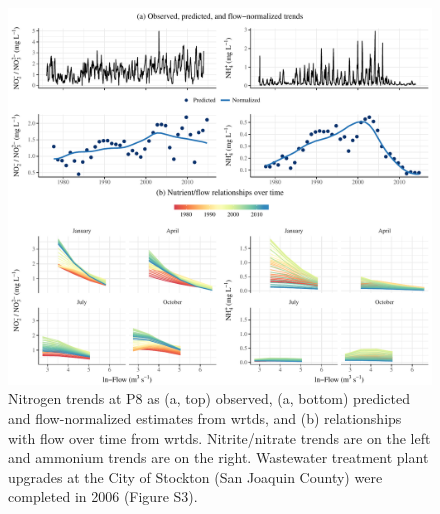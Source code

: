 \documentclass[journal = esthag, manuscript = article]{achemso}\usepackage[]{graphicx}\usepackage[]{color}
\begin{document}
\begin{figure}[!ht]

{\centering \includegraphics[width=\textwidth]{figs/p8trnds-1} 

}

\caption[Nitrogen trends at P8 as (a, top) observed, (a, bottom) predicted and flow-normalized estimates from \ac{wrtds}, and (b) relationships with flow over time from \ac{wrtds}]{Nitrogen trends at P8 as (a, top) observed, (a, bottom) predicted and flow-normalized estimates from \ac{wrtds}, and (b) relationships with flow over time from \ac{wrtds}.  Nitrite/nitrate trends are on the left and ammonium trends are on the right.  Wastewater treatment plant upgrades at the City of Stockton (San Joaquin County) were completed in 2006 (Figure S3).}\label{fig:p8trnds}
\end{figure}
\end{document}
